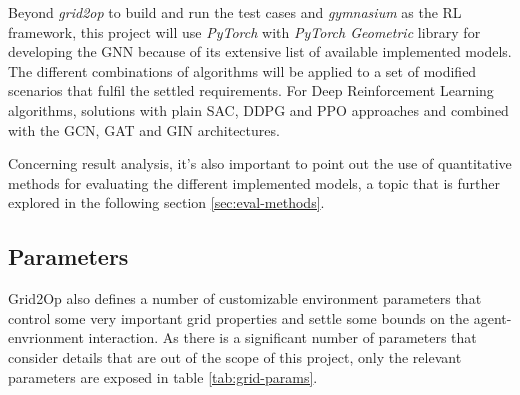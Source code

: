 Beyond \textit{grid2op} to build and run the test cases and \textit{gymnasium} as the RL framework, this project will use \textit{PyTorch} \cite{pytorchPyTorch} with \textit{PyTorch Geometric} \cite{pygteamPyGPytorch_geometric} library for developing the \ac{GNN} because of its extensive list of available implemented models. The different combinations of algorithms will be applied to a set of modified scenarios that fulfil the settled requirements. For Deep Reinforcement Learning algorithms, solutions with plain \ac{SAC}, \ac{DDPG} and \ac{PPO} approaches and combined with the \ac{GCN}, \ac{GAT} and \ac{GIN} architectures.  \par
Concerning result analysis, it's also important to point out the use of quantitative methods for evaluating the different implemented models, a topic that is further explored in the following section \ref{sec:eval-methods}.

\subsection{Parameters}

Grid2Op also defines a number of customizable environment parameters that control some very important grid properties and settle some bounds on the agent-envrionment interaction. As there is a significant number of parameters that consider details that are out of the scope of this project, only the relevant parameters are exposed in table \ref{tab:grid-params}.


